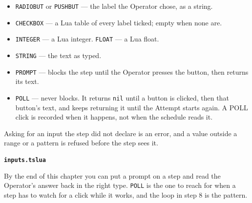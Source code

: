 \begin{itemize}
  \item \texttt{RADIOBUT} or \texttt{PUSHBUT} --- the label the Operator chose, as a string.
  \item \texttt{CHECKBOX} --- a Lua table of every label ticked; empty when none are.
  \item \texttt{INTEGER} --- a Lua integer. \texttt{FLOAT} --- a Lua float.
  \item \texttt{STRING} --- the text as typed.
  \item \texttt{PROMPT} --- blocks the step until the Operator presses the button, then returns
    its text.
  \item \texttt{POLL} --- never blocks. It returns \texttt{nil} until a button is clicked, then
    that button's text, and keeps returning it until the Attempt starts again. A POLL click is
    recorded when it happens, not when the schedule reads it.
\end{itemize}

Asking for an input the step did not declare is an error, and a value outside a range or a
pattern is refused before the step sees it.

\noindent\textbf{\texttt{inputs.tslua}}\par


By the end of this chapter you can put a prompt on a step and read the Operator's answer back
in the right type. \texttt{POLL} is the one to reach for when a step has to watch for a click
while it works, and the loop in step 8 is the pattern.

